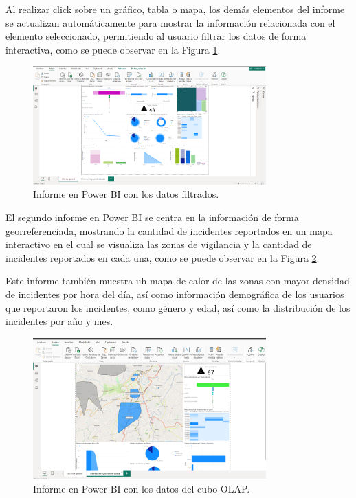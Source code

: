 Al realizar click sobre un gráfico, tabla o mapa, los demás elementos del informe se actualizan automáticamente para mostrar la información
relacionada con el elemento seleccionado, permitiendo al usuario filtrar los datos de forma interactiva, como se puede observar en la Figura
\ref{fig:informe-bi-filtro}.

\begin{figure}[H]
    \centering
    \includegraphics[width=0.8\textwidth]{chapters/III-resultados-y-discusion/resources/images/informe-bi-filtro.png}
    \caption{Informe en Power BI con los datos filtrados.}
    \label{fig:informe-bi-filtro}
\end{figure}

El segundo informe en Power BI se centra en la información de forma georreferenciada, mostrando la cantidad de incidentes reportados
en un mapa interactivo en el cual se visualiza las zonas de vigilancia y la cantidad de incidentes reportados en cada una, como se puede
observar en la Figura \ref{fig:informe-bi-2}.
\bigbreak

Este informe también muestra uh mapa de calor de las zonas con mayor densidad de incidentes por hora del día, así como información demográfica
de los usuarios que reportaron los incidentes, como género y edad, así como la distribución de los incidentes por año y mes.

\begin{figure}[H]
    \centering
    \includegraphics[width=0.8\textwidth]{chapters/III-resultados-y-discusion/resources/images/informe-bi-geo.png}
    \caption{Informe en Power BI con los datos del cubo OLAP.}
    \label{fig:informe-bi-2}
\end{figure}

